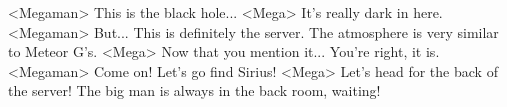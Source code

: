 <Megaman> This is the black hole... 
<Mega> It's really dark in here. 
<Megaman> But... This is definitely the server. The atmosphere is very similar to Meteor G's. 
<Mega> Now that you mention it... You're right, it is. 
<Megaman> Come on! Let's go find Sirius! 
<Mega> Let's head for the back of the server! 
The big man is always in the back room, waiting! 
